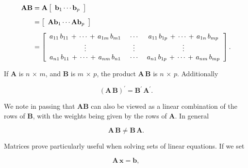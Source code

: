 \documentclass[graybox,envcountchap,sectrefs]{svmono}\usepackage[]{graphicx}\usepackage[]{xcolor}
\begin{document}
\begin{appendices}
\begin{align}
\mathrm{\mathbf{AB}} & =\mathrm{\mathbf{A}}\left[\begin{array}{c}
\mathrm{\mathbf{b}}_{1}\cdots\mathrm{\mathbf{b}}_{p}\end{array}\right]\nonumber \\[0.5em]
 & =\left[\begin{array}{c}
\mathrm{\mathbf{A}}\mathrm{\mathbf{b}}_{1}\cdots\mathrm{\mathrm{\mathbf{A}}\mathbf{b}}_{p}\end{array}\right]\nonumber \\[0.5em]
 & =\left[\begin{array}{ccc}
a_{11}\thinspace b_{11}\,+\,\cdots\,+\,a_{1m}\thinspace b_{m1} & \ \cdots\  & a_{11}\thinspace b_{1p}\,+\,\cdots\,+\,a_{1n}\thinspace b_{mp}\\
\vdots & \vdots & \vdots\\
a_{n1}\thinspace b_{11}\,+\,\cdots\,+\,a_{nm}\thinspace b_{n1} & \ \cdots\  & a_{n1}\thinspace b_{1p}\,+\,\cdots\,+\,a_{nm}\thinspace b_{mp}
\end{array}\right].\label{eq:MatrixMultiplication}
\end{align}

If $\mathrm{\mathbf{A}}$ is $n\,\times\,m$, and $\mathrm{\mathbf{B}}$
is $m\,\times\,p$, the product $\mathrm{\mathbf{A\,B}}$ is $n\,\times\,p$.
Additionally

\begin{equation}
\left(\mathrm{\mathbf{A\,B}}\right)^{\prime}=\mathrm{\mathbf{B}}^{\prime}\,\mathrm{\mathbf{A}}^{\prime}.\label{eq:ABtranspose}
\end{equation}

We note in passing that $\mathrm{\mathbf{AB}}$ can also be viewed
as a linear combination of the rows of $\mathrm{\mathbf{B}}$, with
the weights being given by the rows of $\mathrm{\mathbf{A}}.$ In
general

\begin{equation}
\mathrm{\mathbf{A\,B}}\ne\mathrm{\mathbf{B\,A}.}\label{eq:ABneBA}
\end{equation}

Matrices prove particularly useful when solving sets of linear equations.
If we set 

\begin{equation}
\mathrm{\mathbf{A\,x}}=\mathrm{\mathbf{b},}\label{eq:AxEQb}
\end{equation}


\end{appendices}
\end{document}
